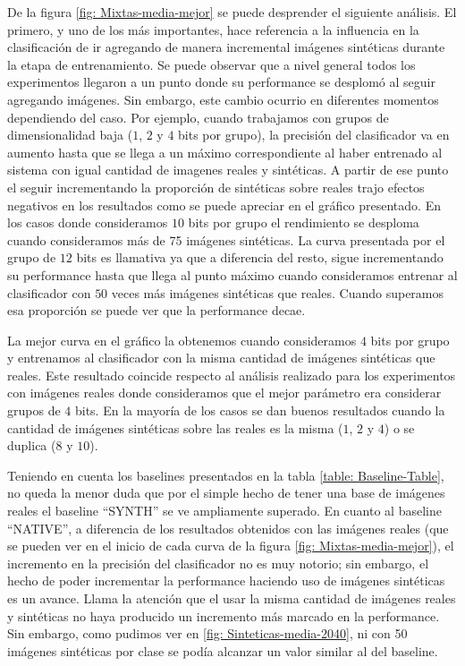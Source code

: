 	De la figura \ref{fig: Mixtas-media-mejor} se puede desprender el siguiente análisis. El primero, y uno de los más importantes, hace referencia a la influencia en la clasificación de ir agregando de manera incremental imágenes sintéticas durante la etapa de entrenamiento. Se puede observar que a nivel general todos los experimentos llegaron a un punto donde su performance se desplomó al seguir agregando imágenes. Sin embargo, este cambio ocurrio en diferentes momentos dependiendo del caso. Por ejemplo, cuando trabajamos con grupos de dimensionalidad baja ($1$, $2$ y $4$ bits por grupo), la precisión del clasificador va en aumento hasta que se llega a un máximo correspondiente al haber entrenado al sistema con igual cantidad de imagenes reales y sintéticas. A partir de ese punto el seguir incrementando la proporción de sintéticas sobre reales trajo efectos negativos en los resultados como se puede apreciar en el gráfico presentado. En los casos donde consideramos $10$ bits por grupo el rendimiento se desploma cuando consideramos más de 75 imágenes sintéticas. La curva presentada por el grupo de $12$ bits es llamativa ya que a diferencia del resto, sigue incrementando su performance hasta que llega al punto máximo cuando consideramos entrenar al clasificador con $50$ veces más imágenes sintéticas que reales. Cuando superamos esa proporción se puede ver que la performance decae.
	
	 La mejor curva en el gráfico la obtenemos cuando consideramos $4$ bits por grupo y entrenamos al clasificador con la misma cantidad de imágenes sintéticas que reales. Este resultado coincide respecto al análisis realizado para los experimentos con imágenes reales donde consideramos que el mejor parámetro era considerar grupos de $4$ bits. En la mayoría de los casos se dan buenos resultados cuando la cantidad de imágenes sintéticas sobre las reales es la misma ($1$, $2$ y $4$) o se duplica ($8$ y $10$).
	 
	 Teniendo en cuenta los baselines presentados en la tabla \ref{table: Baseline-Table}, no queda la menor duda que por el simple hecho de tener una base de imágenes reales el baseline ``SYNTH'' se ve ampliamente superado. En cuanto al baseline ``NATIVE'', a diferencia de los resultados obtenidos con las imágenes reales (que se pueden ver en el inicio de cada curva de la figura \ref{fig: Mixtas-media-mejor}), el incremento en la precisión del clasificador no es muy notorio; sin embargo, el hecho de poder incrementar la performance haciendo uso de imágenes sintéticas es un avance. Llama la atención que el usar la misma cantidad de imágenes reales y sintéticas no haya producido un incremento más marcado en la performance. Sin embargo, como pudimos ver en \ref{fig: Sinteticas-media-2040}, ni con 50 imágenes sintéticas por clase se podía alcanzar un valor similar al del baseline.

